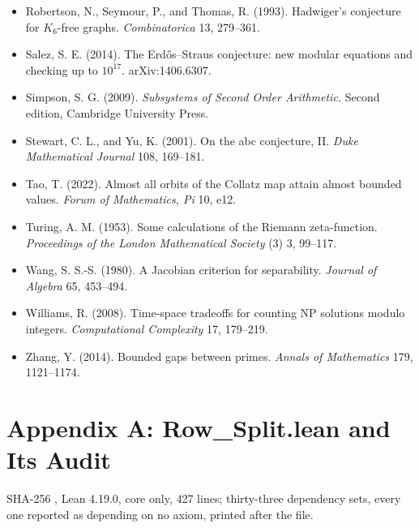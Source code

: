 \documentclass[10pt]{article}
\begin{document}
\begin{itemize}
  \(2996863034895 \cdot 2^{1290000} \pm 1\). primegrid.com, September
  2016.
\item
  Robertson, N., Seymour, P., and Thomas, R. (1993). Hadwiger's
  conjecture for \(K_6\)-free graphs. \emph{Combinatorica} 13, 279--361.
\item
  Salez, S. E. (2014). The Erdős--Straus conjecture: new modular
  equations and checking up to \(10^{17}\). arXiv:1406.6307.
\item
  Simpson, S. G. (2009). \emph{Subsystems of Second Order Arithmetic.}
  Second edition, Cambridge University Press.
\item
  Stewart, C. L., and Yu, K. (2001). On the abc conjecture, II.
  \emph{Duke Mathematical Journal} 108, 169--181.
\item
  Tao, T. (2022). Almost all orbits of the Collatz map attain almost
  bounded values. \emph{Forum of Mathematics, Pi} 10, e12.
\item
  Turing, A. M. (1953). Some calculations of the Riemann zeta-function.
  \emph{Proceedings of the London Mathematical Society} (3) 3, 99--117.
\item
  Wang, S. S.-S. (1980). A Jacobian criterion for separability.
  \emph{Journal of Algebra} 65, 453--494.
\item
  Williams, R. (2008). Time-space tradeoffs for counting NP solutions
  modulo integers. \emph{Computational Complexity} 17, 179--219.
\item
  Zhang, Y. (2014). Bounded gaps between primes. \emph{Annals of
  Mathematics} 179, 1121--1174.
\end{itemize}

\hypertarget{appendix-a-row_split.lean-and-its-audit}{%
\twocolumn
\section{Appendix A: Row\_Split.lean and Its
Audit}\label{appendix-a-row_split.lean-and-its-audit}}

SHA-256
\texttt{},
Lean 4.19.0, core only, 427 lines; thirty-three dependency sets, every
one reported as depending on no axiom, printed after the file.

\begingroup\scriptsize
\end{document}
